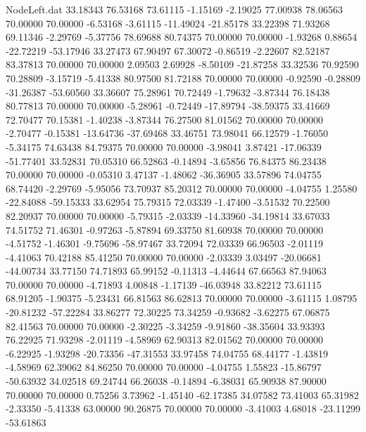 \begin{filecontents}{NodeLeft.dat}
  33.18343   76.53168   73.61115    -1.15169   -2.19025   77.00938   78.06563   70.00000   70.00000   -6.53168   -3.61115  -11.49024  -21.85178
  33.22398   71.93268   69.11346    -2.29769   -5.37756   78.69688   80.74375   70.00000   70.00000   -1.93268    0.88654  -22.72219  -53.17946
  33.27473   67.90497   67.30072    -0.86519   -2.22607   82.52187   83.37813   70.00000   70.00000    2.09503    2.69928   -8.50109  -21.87258
  33.32536   70.92590   70.28809    -3.15719   -5.41338   80.97500   81.72188   70.00000   70.00000   -0.92590   -0.28809  -31.26387  -53.60560
  33.36607   75.28961   70.72449    -1.79632   -3.87344   76.18438   80.77813   70.00000   70.00000   -5.28961   -0.72449  -17.89794  -38.59375
  33.41669   72.70477   70.15381    -1.40238   -3.87344   76.27500   81.01562   70.00000   70.00000   -2.70477   -0.15381  -13.64736  -37.69468
  33.46751   73.98041   66.12579    -1.76050   -5.34175   74.63438   84.79375   70.00000   70.00000   -3.98041    3.87421  -17.06339  -51.77401
  33.52831   70.05310   66.52863    -0.14894   -3.65856   76.84375   86.23438   70.00000   70.00000   -0.05310    3.47137   -1.48062  -36.36905
  33.57896   74.04755   68.74420    -2.29769   -5.95056   73.70937   85.20312   70.00000   70.00000   -4.04755    1.25580  -22.84088  -59.15333
  33.62954   75.79315   72.03339    -1.47400   -3.51532   70.22500   82.20937   70.00000   70.00000   -5.79315   -2.03339  -14.33960  -34.19814
  33.67033   74.51752   71.46301    -0.97263   -5.87894   69.33750   81.60938   70.00000   70.00000   -4.51752   -1.46301   -9.75696  -58.97467
  33.72094   72.03339   66.96503    -2.01119   -4.41063   70.42188   85.41250   70.00000   70.00000   -2.03339    3.03497  -20.06681  -44.00734
  33.77150   74.71893   65.99152    -0.11313   -4.44644   67.66563   87.94063   70.00000   70.00000   -4.71893    4.00848   -1.17139  -46.03948
  33.82212   73.61115   68.91205    -1.90375   -5.23431   66.81563   86.62813   70.00000   70.00000   -3.61115    1.08795  -20.81232  -57.22284
  33.86277   72.30225   73.34259    -0.93682   -3.62275   67.06875   82.41563   70.00000   70.00000   -2.30225   -3.34259   -9.91860  -38.35604
  33.93393   76.22925   71.93298    -2.01119   -4.58969   62.90313   82.01562   70.00000   70.00000   -6.22925   -1.93298  -20.73356  -47.31553
  33.97458   74.04755   68.44177    -1.43819   -4.58969   62.39062   84.86250   70.00000   70.00000   -4.04755    1.55823  -15.86797  -50.63932
  34.02518   69.24744   66.26038    -0.14894   -6.38031   65.90938   87.90000   70.00000   70.00000    0.75256    3.73962   -1.45140  -62.17385
  34.07582   73.41003   65.31982    -2.33350   -5.41338   63.00000   90.26875   70.00000   70.00000   -3.41003    4.68018  -23.11299  -53.61863

\end{filecontents}
